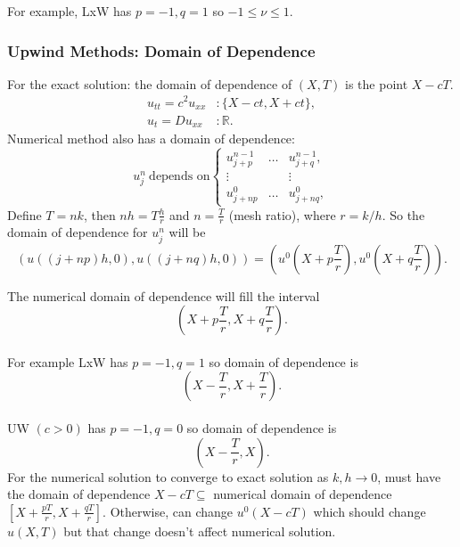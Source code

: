 \documentclass[12pt, a4paper]{article}
\theoremstyle{definition}
\theoremstyle{remark}
\numberwithin{equation}{section}
\begin{document}
For example, LxW has $p=-1, q=1$ so $-1 \le \nu \le 1$.

\newpage
\subsubsection{Upwind Methods: Domain of Dependence}

For the exact solution: the domain of dependence of $(X,T)$ is the point $X - cT$.
\begin{align*}
u_{tt} = c^2 u_{xx} &: \{ X-ct, X+ct \}, \\
u_t = D u_{xx} &: \mathbb{R}.
\end{align*}
Numerical method also has a domain of dependence:
$$u_j^n\ \text{depends on} \left\{ \begin{array}{ccc}
u_{j+p}^{n-1} & \ldots & u_{j+q}^{n-1}, \\
\vdots && \vdots \\
u_{j+np}^{0} & \ldots & u_{j+nq}^{0}, 
\end{array} \right. $$
Define $T = nk$, then $nh = T\tfrac{h}{r}$ and $n = \tfrac{T}{r}$ (mesh ratio),
where $r = k/h$. So the domain of dependence for $u_j^n$ will be
$$(u((j+np)h, 0), u((j+nq)h,0)) = \left(u^0\left(X + p\frac{T}{r}\right), u^0\left(X + q\frac{T}{r}\right)\right).$$

The numerical domain of dependence will fill the interval 
$$\left(X + p\frac{T}{r}, X + q\frac{T}{r}\right).$$ \\
For example LxW has $p=-1, q=1$ so domain of dependence is 
$$\left(X-\frac{T}{r}, X+\frac{T}{r}\right).$$ \\
UW $(c>0)$ has $p=-1, q=0$ so domain of dependence is 
$$\left(X - \frac{T}{r}, X\right).$$
For the numerical solution to converge to exact solution as $k, h \rightarrow 0$,
must have the domain of dependence $X-cT \subseteq $ numerical domain of
dependence $[X + \frac{pT}{r}, X + \frac{qT}{r}]$. Otherwise, can change
$u^0(X-cT)$ which should change $u(X,T)$ but that change doesn't affect
numerical solution.

\vspace{5 cm}

\newpage
\end{document}
